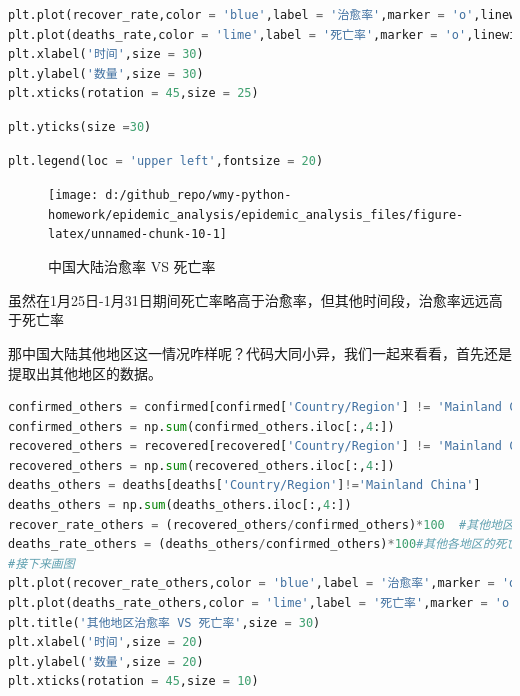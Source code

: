 \documentclass[UTF8,a4paper,12pt]{ctexart}  %
\begin{document}
\begin{lstlisting}[language=Python]
plt.plot(recover_rate,color = 'blue',label = '治愈率',marker = 'o',linewidth=2,markersize=3)
plt.plot(deaths_rate,color = 'lime',label = '死亡率',marker = 'o',linewidth=2,markersize=3)
plt.xlabel('时间',size = 30)
plt.ylabel('数量',size = 30)
plt.xticks(rotation = 45,size = 25)
\end{lstlisting}

\begin{lstlisting}[language=Python]
plt.yticks(size =30)
\end{lstlisting}

\begin{lstlisting}[language=Python]
plt.legend(loc = 'upper left',fontsize = 20)
\end{lstlisting}

\begin{figure}

{\centering \texttt{[image: d:/github\_repo/wmy-python-homework/epidemic\_analysis/epidemic\_analysis\_files/figure-latex/unnamed-chunk-10-1]} 

}

\caption{中国大陆治愈率 VS 死亡率}\label{fig:unnamed-chunk-10}
\end{figure}

虽然在1月25日-1月31日期间死亡率略高于治愈率，但其他时间段，治愈率远远高于死亡率

那中国大陆其他地区这一情况咋样呢？代码大同小异，我们一起来看看，首先还是提取出其他地区的数据。

\begin{lstlisting}[language=Python]
confirmed_others = confirmed[confirmed['Country/Region'] != 'Mainland China']
confirmed_others = np.sum(confirmed_others.iloc[:,4:])
recovered_others = recovered[recovered['Country/Region'] != 'Mainland China']
recovered_others = np.sum(recovered_others.iloc[:,4:])
deaths_others = deaths[deaths['Country/Region']!='Mainland China']
deaths_others = np.sum(deaths_others.iloc[:,4:])
recover_rate_others = (recovered_others/confirmed_others)*100  #其他地区的治愈率
deaths_rate_others = (deaths_others/confirmed_others)*100#其他各地区的死亡率
#接下来画图
plt.plot(recover_rate_others,color = 'blue',label = '治愈率',marker = 'o')
plt.plot(deaths_rate_others,color = 'lime',label = '死亡率',marker = 'o')
plt.title('其他地区治愈率 VS 死亡率',size = 30)
plt.xlabel('时间',size = 20)
plt.ylabel('数量',size = 20)
plt.xticks(rotation = 45,size = 10)
\end{lstlisting}
\end{document}

